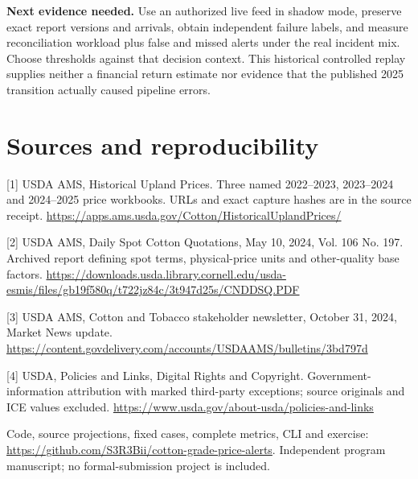 \documentclass[10pt,letterpaper]{article}
\begin{document}
\textbf{Next evidence needed.} Use an authorized live feed in shadow mode, preserve exact report versions and arrivals, obtain independent failure labels, and measure reconciliation workload plus false and missed alerts under the real incident mix. Choose thresholds against that decision context. This historical controlled replay supplies neither a financial return estimate nor evidence that the published 2025 transition actually caused pipeline errors.

\section*{Sources and reproducibility}
\small
[1] USDA AMS, Historical Upland Prices. Three named 2022--2023, 2023--2024 and 2024--2025 price workbooks. URLs and exact capture hashes are in the source receipt. \url{https://apps.ams.usda.gov/Cotton/HistoricalUplandPrices/}

[2] USDA AMS, Daily Spot Cotton Quotations, May 10, 2024, Vol. 106 No. 197. Archived report defining spot terms, physical-price units and other-quality base factors. \url{https://downloads.usda.library.cornell.edu/usda-esmis/files/gb19f580q/t722jz84c/3t947d25s/CNDDSQ.PDF}

[3] USDA AMS, Cotton and Tobacco stakeholder newsletter, October 31, 2024, Market News update. \url{https://content.govdelivery.com/accounts/USDAAMS/bulletins/3bd797d}

[4] USDA, Policies and Links, Digital Rights and Copyright. Government-information attribution with marked third-party exceptions; source originals and ICE values excluded. \url{https://www.usda.gov/about-usda/policies-and-links}

Code, source projections, fixed cases, complete metrics, CLI and exercise: \url{https://github.com/S3R3Bii/cotton-grade-price-alerts}. Independent program manuscript; no formal-submission project is included.
\end{document}
